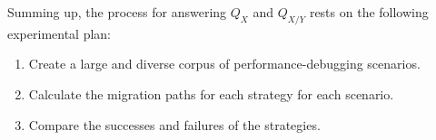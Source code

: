 Summing up, the process for answering $Q_X$ and $Q_{X/Y}$ rests on the following
experimental plan:
\begin{enumerate}

\item Create a large and diverse corpus of performance-debugging scenarios.

\item Calculate the migration paths for each strategy for
  each scenario.

\item Compare the successes and failures of the strategies.

\end{enumerate}


